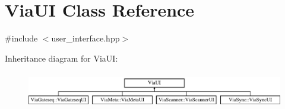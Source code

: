 \hypertarget{class_via_u_i}{}\section{Via\+UI Class Reference}
\label{class_via_u_i}


{\ttfamily \#include $<$user\+\_\+interface.\+hpp$>$}

Inheritance diagram for Via\+UI\+:\begin{figure}[H]
\begin{center}
\leavevmode
\includegraphics[height=1.637427cm]{class_via_u_i}
\end{center}
\end{figure}
